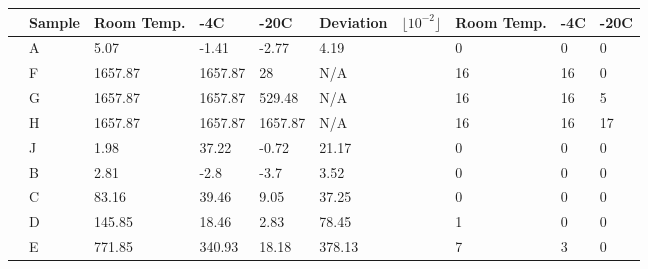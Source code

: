 \documentclass[a4paper,xcolor=table]{article}
\newcommand{\C}{\degree C}
\begin{document}
\begin{figure}[ht]
\centering
\begin{tabular}{|l|l|l|l|l|l|l|l|l|l|}
\hline
    \quad{} &Sample                                                  & Room Temp. & -4\C{}  & -20\C{} & Deviation& $\lfloor 10^{-2}\rfloor$ &Room Temp. & -4\C{} & -20\C{}    \\ \hline
\cellcolor[HTML]{32CB00}                                              & A         & 5.07    & -1.41   & -2.77                       & 4.19                                                        &          & 0      & 0       & 0  \\ \cline{2-10} 
\cellcolor[HTML]{32CB00}                                              & F         & 1657.87 & 1657.87 & 28                          & N/A                                                         &          & 16     & 16      & 0  \\ \cline{2-10} 
\cellcolor[HTML]{32CB00}                                              & G         & 1657.87 & 1657.87 & 529.48                      & N/A                                                         &          & 16     & 16      & 5  \\ \cline{2-10} 
\multirow{-4}{*}{\cellcolor[HTML]{32CB00}} & H         & 1657.87 & 1657.87 & 1657.87                     & N/A                                                         &          & 16     & 16      & 17 \\ \hline
\cellcolor[HTML]{FFCB2F}       & J         & 1.98    & 37.22   & -0.72                       & 21.17                                                       &          & 0      & 0       & 0  \\ \hline
\cellcolor[HTML]{FE0000}                                              & B         & 2.81    & -2.8    & -3.7                        & 3.52                                                        &          & 0      & 0       & 0  \\ \cline{2-10} 
\cellcolor[HTML]{FE0000}                                              & C         & 83.16   & 39.46   & 9.05                        & 37.25                                                       &         & 0      & 0       & 0  \\ \cline{2-10} 
\cellcolor[HTML]{FE0000}                                              & D         & 145.85  & 18.46   & 2.83                        & 78.45                                                       &          & 1      & 0       & 0  \\ \cline{2-10} 
\cellcolor[HTML]{FE0000}                                              & E         & 771.85  & 340.93  & 18.18                       & 378.13                                                      &          & 7      & 3       & 0  \\ \cline{2-10} 

\end{tabular}
\end{figure}
\end{document}
